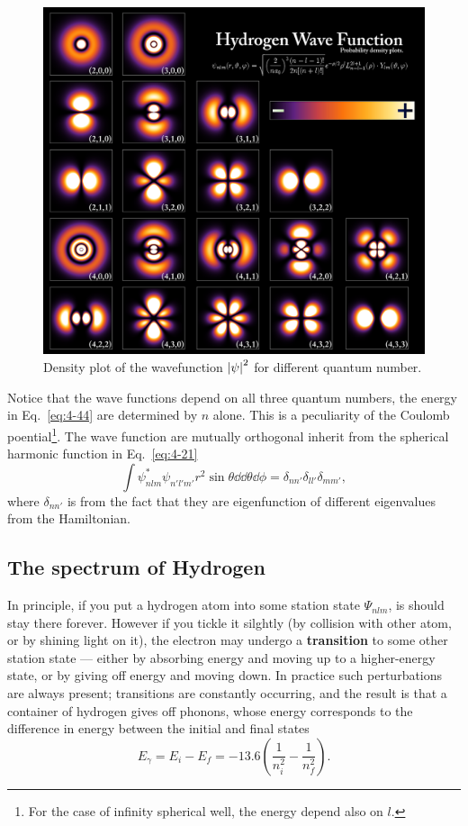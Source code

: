 \begin{figure}[h]
  \centering
  \includegraphics[width=1.\textwidth]{fig/fig4-2.png}
  \caption{Density plot of the wavefunction $\abs{\psi}^2$ for different quantum number.}
  \label{fig:4-2}
\end{figure}

Notice that the wave functions depend on all three quantum numbers, the energy in Eq.~\eqref{eq:4-44} are determined by $n$ alone.
This is a peculiarity of the Coulomb poential\footnote{For the case of infinity spherical well, the energy depend also on $l$.}.
The wave function are mutually orthogonal inherit from the spherical harmonic function in Eq.~\eqref{eq:4-21}
\begin{equation}
  \label{eq:4-63}
  \int \psi^{*}_{nlm} \psi_{n'l'm'} r^2 \sin \theta \dd  \dd \theta \dd \phi = \delta_{nn'} \delta_{ll'} \delta_{mm'},
\end{equation}
where $\delta_{n n'}$ is from the fact that they are eigenfunction of different eigenvalues from the Hamiltonian.

\subsection{The spectrum of Hydrogen}
In principle, if you put a hydrogen atom into some station state $\Psi_{nlm}$, is should stay there forever.
However if you tickle it silghtly (by collision with other atom, or by shining light on it), the electron may undergo a \textbf{transition} to some other station state --- either by absorbing energy and moving up to a higher-energy state, or by giving off energy and moving down.
In practice such perturbations are always present; transitions are constantly occurring, and the result is that a container of hydrogen gives off phonons, whose energy corresponds to the difference in energy between the initial and final states
\begin{equation}
  \label{eq:4-64}
  E_{\gamma} = E_i-E_f = -13.6 \left( \frac{1}{n_{i}^2} - \frac{1}{n_{f}^{2}} \right) .
\end{equation}

